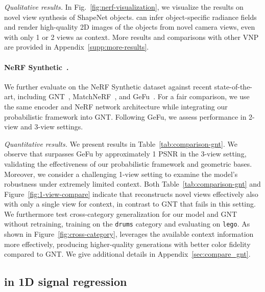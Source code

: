 \emph{Qualitative results.}
In Fig.~\ref{fig:nerf-visualization}, we visualize the results on novel view synthesis of ShapeNet objects.
\name{} can infer object-specific radiance fields and render high-quality 2D images of the objects from novel camera views, even with only 1 or 2 views as context. More results and comparisons with other VNP are provided in Appendix~\ref{supp:more-results}.

\paragraph{NeRF Synthetic~\citep{mildenhall2021nerf}.} We further evaluate on the NeRF Synthetic dataset against recent state-of-the-art, including GNT~\citep{wang2022attention}, MatchNeRF~\citep{chen2023explicit}, and GeFu~\citep{liu2024geometry}.
For a fair comparison, we use the same encoder and NeRF network architecture while integrating our probabilistic framework into GNT.
Following GeFu, we assess performance in 2-view and 3-view settings.



\emph{Quantitative results.} We present results in Table~\ref{tab:comparison-gnt}.
We observe that \name{} surpasses GeFu by approximately 1 PSNR in the 3-view setting, validating the effectiveness of our probabilistic framework and geometric bases.
Moreover, we consider a challenging 1-view setting to examine the model’s robustness under extremely limited context.
Both Table~\ref{tab:comparison-gnt} and Figure~\ref{fig:1-view-compare} indicate that \name{} reconstructs novel views effectively also with only a single view for context, in contrast to GNT that fails in this setting.
We furthermore test cross-category generalization for our model and GNT without retraining, training on the \texttt{drums} category and evaluating on \texttt{lego}.
As shown in Figure~\ref{fig:cross-category}, \name{} leverages the available context information more effectively, producing higher-quality generations with better color fidelity compared to GNT.
We give additional details in Appendix~\ref{sec:compare_gnt}.





\subsection{\name{} in 1D signal regression}

